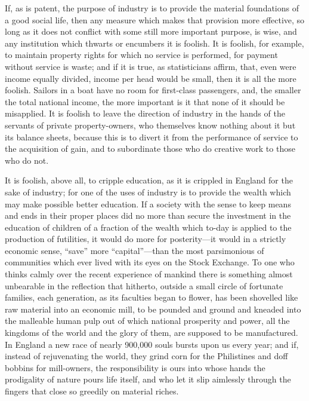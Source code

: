 \documentclass{book}
\begin{document}
If, as is patent, the purpose of industry is to provide the material foundations of a good social life, then any measure which makes that provision more effective, so long as it does not conflict with some still more important purpose, is wise, and any institution which thwarts or encumbers it is foolish. It is foolish, for example, to maintain property rights for which no service is performed, for payment without service is waste; and if it is true, as statisticians affirm, that, even were income equally divided, income per head would be small, then it is all the more foolish. Sailors in a boat have no room for first-class passengers, and, the smaller the total national income, the more important is it that none of it should be misapplied. It is foolish to leave the direction of industry in the hands of the servants of private property-owners, who themselves know nothing about it but its balance sheets, because this is to divert it from the performance of service to the acquisition of gain, and to subordinate those who do creative work to those who do not.

It is foolish, above all, to cripple education, as it is crippled in England for the sake of industry; for one of the uses of industry is to provide the wealth which may make possible better education. If a society with the sense to keep means and ends in their proper places did no more than secure the investment in the education of children of a fraction of the wealth which to-day is applied to the production of futilities, it would do more for posterity—it would in a strictly economic sense, “save” more “capital”—than the most parsimonious of communities which ever lived with its eyes on the Stock Exchange. To one who thinks calmly over the recent experience of mankind there is something almost unbearable in the reflection that hitherto, outside a small circle of fortunate families, each generation, as its faculties began to flower, has been shovelled like raw material into an economic mill, to be pounded and ground and kneaded into the malleable human pulp out of which national prosperity and power, all the kingdoms of the world and the glory of them, are supposed to be manufactured. In England a new race of nearly 900,000 souls bursts upon us every year; and if, instead of rejuvenating the world, they grind corn for the Philistines and doff bobbins for mill-owners, the responsibility is ours into whose hands the prodigality of nature pours life itself, and who let it slip aimlessly through the fingers that close so greedily on material riches.
\end{document}
